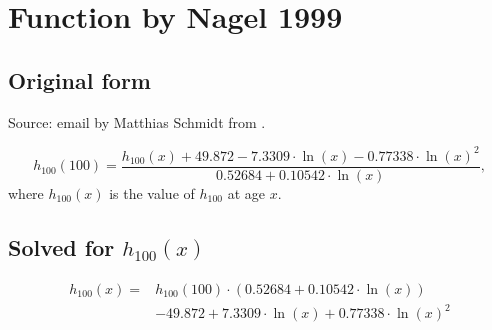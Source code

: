 
\section{Function by Nagel 1999}

\subsection{Original form}
Source: email by Matthias Schmidt from  .

\begin{equation}
  \label{eq:nagel.1999}
  h_{100}(100) = \frac{h_{100}(x) + 49.872 - 7.3309 \cdot \ln(x) - 0.77338 \cdot \ln(x)^2 }{0.52684 + 0.10542 \cdot \ln(x)} , 
\end{equation}
where $h_{100}(x)$ is the value of $h_{100}$ at age $x$.

\subsection{Solved for $h_{100}(x)$}

\begin{equation}
\begin{split}
  \label{eq:nagel.1999.solved.h100}
  h_{100}(x) = &h_{100}(100) \cdot (0.52684 + 0.10542 \cdot \ln(x)) \\
  &- 49.872 + 7.3309 \cdot \ln(x) + 0.77338 \cdot \ln(x)^2
\end{split}
\end{equation}

